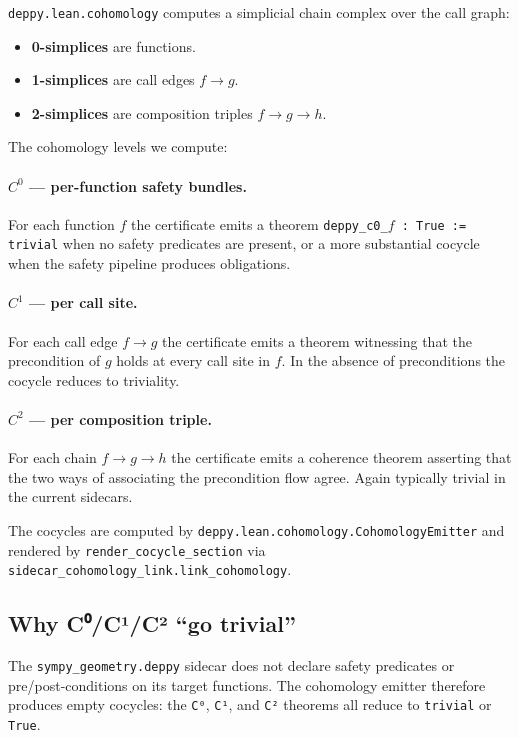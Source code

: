 \texttt{deppy.lean.cohomology} computes a simplicial chain complex
over the call graph:
\begin{itemize}[leftmargin=1.7em]
  \item \textbf{0-simplices} are functions.
  \item \textbf{1-simplices} are call edges $f \to g$.
  \item \textbf{2-simplices} are composition triples $f \to g \to h$.
\end{itemize}

The cohomology levels we compute:

\paragraph{$C^0$ --- per-function safety bundles.}  For each function
$f$ the certificate emits a theorem
\texttt{deppy\_c0\_$f$ : True := trivial} when no safety predicates
are present, or a more substantial cocycle when the safety
pipeline produces obligations.

\paragraph{$C^1$ --- per call site.}  For each call edge $f \to g$
the certificate emits a theorem witnessing that the precondition
of $g$ holds at every call site in $f$.  In the absence of
preconditions the cocycle reduces to triviality.

\paragraph{$C^2$ --- per composition triple.}  For each chain
$f \to g \to h$ the certificate emits a coherence theorem
asserting that the two ways of associating the precondition flow
agree.  Again typically trivial in the current sidecars.

The cocycles are computed by
\texttt{deppy.lean.cohomology.CohomologyEmitter} and rendered by
\texttt{render\_cocycle\_section} via
\texttt{sidecar\_cohomology\_link.link\_cohomology}.

\subsection{Why C⁰/C¹/C² ``go trivial''}

The \texttt{sympy\_geometry.deppy} sidecar does not declare safety
predicates or pre/post-conditions on its target functions.  The
cohomology emitter therefore produces empty cocycles: the
\texttt{C⁰}, \texttt{C¹}, and \texttt{C²} theorems all reduce to
\texttt{trivial} or \texttt{True}.

